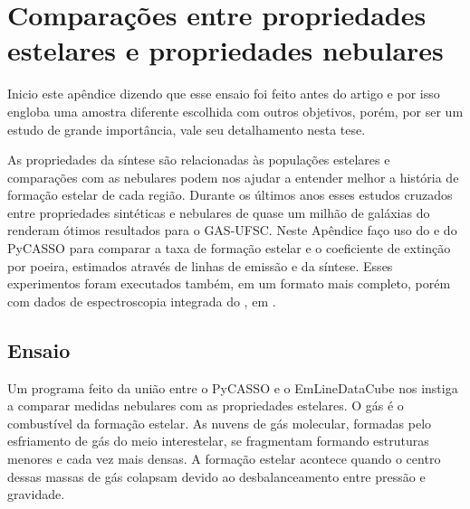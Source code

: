 

\chapter{Comparações entre propriedades estelares e propriedades nebulares}
\label{apendice:synvsneb}

Inicio este apêndice dizendo que esse ensaio foi feito antes do artigo \citet{Lacerda.etal.2018} e por isso engloba uma amostra diferente escolhida com outros objetivos, porém, por ser um estudo de grande importância, vale seu detalhamento nesta tese.

As propriedades da síntese são relacionadas às populações estelares e comparações com as nebulares podem nos ajudar a entender melhor a história de formação estelar de cada região. Durante os últimos anos esses estudos cruzados entre propriedades sintéticas e nebulares de quase um milhão de galáxias do \SDSS renderam ótimos resultados para o GAS-UFSC. Neste Apêndice faço uso do \emldc e do PyCASSO para comparar a taxa de formação estelar e o coeficiente de extinção por poeira, estimados através de linhas de emissão e da síntese. Esses experimentos foram executados também, em um formato mais completo, porém com dados de espectroscopia integrada do \SDSS, em \citet{Mari2016}.


\section{Ensaio}
\label{apendice:synvsneb:ensaio}
Um programa feito da união entre o PyCASSO e o EmLineDataCube nos instiga a comparar medidas nebulares com as propriedades estelares. O gás é o combustível da formação estelar. As nuvens de gás molecular, formadas pelo esfriamento de gás do meio interestelar, se fragmentam formando estruturas menores e cada vez mais densas. A formação estelar acontece quando o centro dessas massas de gás colapsam devido ao desbalanceamento entre pressão e gravidade.

